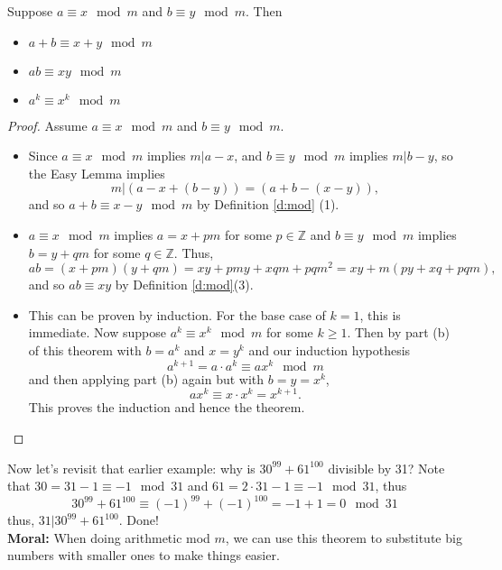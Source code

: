 \documentclass[11pt,dvipsnames]{book}
\def\hcf{{\rm hcf}}
\numberwithin{equation}{section} %
\numberwithin{figure}{section} %
\numberwithin{table}{section} %
\begin{document}
\begin{exercise}
\begin{theorem}
\label{t:mod-artithmetic}
Suppose $a \equiv x \mod m$ and $b\equiv y \mod m$. Then
\begin{itemize}
\item $a+b\equiv x+y \mod m$
\item $ab \equiv xy \mod m$
\item  $a^{k}\equiv x^{k} \mod m$
\end{itemize}
\end{theorem}

\begin{proof}
Assume $a \equiv x \mod m$ and $b\equiv y \mod m$.
\begin{itemize}
\item Since $a\equiv x\mod m$ implies $m|a-x$, and $b\equiv y \mod m$ implies $m|b-y$, so the Easy Lemma implies
\[
m|(a-x+(b-y))=(a+b-(x-y)),
\]
and so $a+b\equiv x-y\mod m$ by Definition \ref{d:mod} (1).   
\item $a\equiv x \mod m$ implies $a=x+pm$ for some $p\in\mathbb{Z}$ and $b\equiv y \mod m$ implies $b=y+qm$ for some $q\in\mathbb{Z}$. Thus,
\[
ab = (x+pm)(y+qm) = xy+pmy+xqm+ pqm^2 = xy + m(py+xq+pqm),\]
and so $ab\equiv xy$ by Definition \ref{d:mod}(3).
\item This can be proven by induction. For the base case of $k=1$, this is immediate. Now suppose $a^{k}\equiv x^{k}\mod m$ for some $k\geq 1$. Then by part (b) of this theorem with $b=a^{k}$ and $x=y^{k}$ and our induction hypothesis
\[
a^{k+1}=a\cdot a^{k}\equiv a x^{k} \mod m\]
and then applying part (b) again but with $b=y=x^k$,
\[
a x^{k}\equiv x\cdot x^k=x^{k+1}.\]
This proves the induction and hence the theorem.

\end{itemize}
\end{proof}



Now let's revisit that earlier example: why is $30^{99}+61^{100}$ divisible by 31? Note that $30=31-1\equiv -1\mod 31$ and $61= 2\cdot 31-1\equiv -1\mod 31$, thus 
\[
30^{99}+61^{100}\equiv (-1)^{99}+(-1)^{100}=-1+1=0 \mod 31
\]
thus, $31|30^{99}+61^{100}$. Done!\\

{\bf Moral:} When doing arithmetic mod $m$, we can use this theorem to substitute big numbers with smaller ones to make things easier. 






\def\hcf{{\rm hcf}}



\end{exercise}
\end{document}
